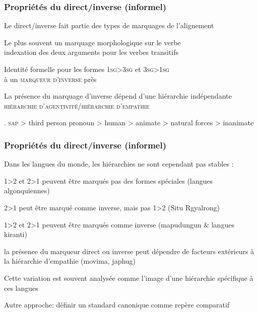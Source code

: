 \begin{frame}
\frametitle{Propriétés du direct/inverse (informel)}
\begin{blackwideitemize}
\item Le direct/inverse fait partie des types de marquages de
  l'alignement
\item Le plus souvent un marquage morphologique sur le verbe\\
\ra indexation des deux arguments pour les verbes transitifs
\item Identité formelle pour les formes \textsc{1sg>3sg} et
  \textsc{3sg>1sg}\\ à un \textsc{marqueur d'inverse} près
\item La présence du marquage d'inverse dépend d'une hiérarchie
  indépendante\\
\ra \textsc{hiérarchie d'agentivité/hiérarchie d'empathie} \cite[644]{delancey81}
\end{blackwideitemize}

\ex. \textsc{sap} > third person pronoun > human > animate > natural
forces > inanimate\label{ex:delancey}

\end{frame}

\begin{frame}
\frametitle{Propriétés du direct/inverse (informel)}
\begin{blackwideitemize}
\item Dans les langues du monde, les hiérarchies ne sont cependant pas
  stables \cite{jacques13inversecompass}:
\begin{smallwideitemize}
\item \textsc{1>2} et \textsc{2>1} peuvent être marqués pas des formes
  spéciales (langues algonquiennes)
\item \textsc{2>1} peut être marqué comme inverse, mais pas \textsc{1>2} (Situ Rgyalrong)
\item \textsc{1>2} et \textsc{2>1} peuvent être marqués comme inverse
  (mapudungun \& langues kiranti)
\item la présence du marqueur direct ou inverse peut dépendre de
  facteurs extérieurs à la hiérarchie d'empathie (movima, japhug)
\end{smallwideitemize}
\item Cette variation est souvent analysée comme l'image d'une
  hiérarchie spécifique à ces langues
\pause
\item Autre approche: définir un standard canonique comme repère
  comparatif 
\end{blackwideitemize}

\end{frame}

